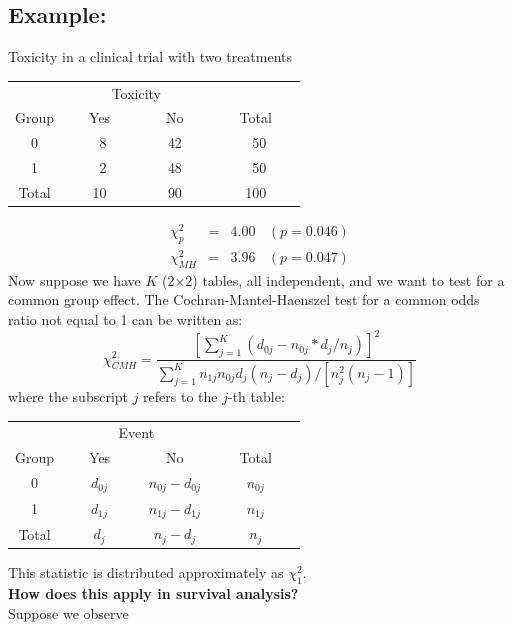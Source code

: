 \documentclass[11pt,slidesonly,semrot,portrait,palatino]{book}
\begin{document}
\subsection{Example:} Toxicity in a clinical trial with two treatments
\begin{center}
\begin{tabular}{cccc}
\hline \hline
& \multicolumn{2}{c}{Toxicity}   \\ \cline{2-3}
\multicolumn{1}{c}{Group } & ~~~Yes~~~ & ~~~No~~~ & ~~~Total~~~ \\ \hline
0 &  ~8    & 42  &  ~50       \\
1 &  ~2   &  48 &   ~50        \\
\hline
Total & 10 & 90 &  100        \\ \hline \hline
\end{tabular}
\end{center}
\begin{eqnarray*}
\chi_p^2 & = & 4.00 ~~~~ (p=0.046)\\[3ex]
\chi_{MH}^2 & = & 3.96 ~~~~ (p=0.047)
\end{eqnarray*}
Now suppose we have $K$ (2$\times 2$) tables, all independent, and we
want to test for a common group effect. The Cochran-Mantel-Haenszel
test for a common odds ratio not equal to 1 can be written as:
\\[2ex]
\[  \chi^2_{CMH} =   \frac{[\sum_{j=1}^K (d_{0j} - n_{0j}*d_j/n_j)]^2}
        {\sum_{j=1}^K n_{1j} n_{0j} d_j (n_j-d_j)/[n_j^2(n_j-1)]}  \]
where the subscript $j$ refers to the $j$-th table:
\begin{center}
\begin{tabular}{cccc}
\hline \hline
& \multicolumn{2}{c}{Event} & \\ \cline{2-3}
\multicolumn{1}{c}{Group } & ~~~Yes~~~ & ~~~No~~~ & ~~~Total~~~\\ \hline
0 & $d_{0j}$ & $n_{0j} - d_{0j}$ & $n_{0j}$  \\
1 & $d_{1j}$ & $n_{1j} - d_{1j}$ & $n_{1j}$ \\
\hline
Total &  $d_j  $ & $n_j - d_j  $ & $n_j  $  \\ \hline \hline
\end{tabular}
\end{center}
This statistic is distributed approximately as $\chi^2_1$.
\\[2ex]
{\bf How does this apply in survival analysis?}
\\[2ex]
Suppose we observe
\\[2ex]
\end{document}
